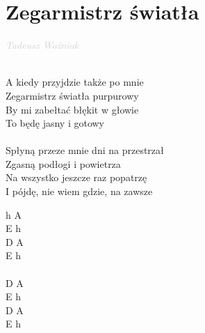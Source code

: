 \documentclass[a5paper, 10pt]{book}
\begin{document}
\section{Zegarmistrz światła}\textcolor{lightgray}{\textit{Tadeusz Woźniak}}\\~\\
\begin{minipage}[t]{0.7\textwidth}
  A kiedy przyjdzie także po mnie\\
  Zegarmistrz światła purpurowy\\
  By mi zabełtać błękit w głowie\\
  To będę jasny i gotowy\\
  \\
  Spłyną przeze mnie dni na przestrzał\\
  Zgasną podłogi i powietrza\\
  Na wszystko jeszcze raz popatrzę\\
  I pójdę, nie wiem gdzie, na zawsze\\
\end{minipage}
\begin{minipage}[t]{0.3\textwidth}
  h A\\
  E h\\
  D A\\
  E h\\
  \\
  D A\\
  E h\\
  D A\\
  E h\\
\end{minipage}

\newpage
\end{document}
